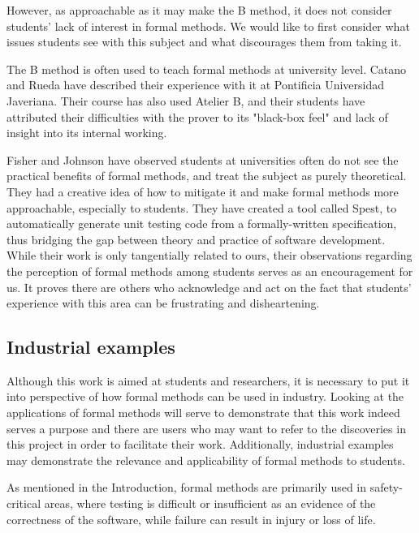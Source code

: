 \documentclass[12pt,journal,duplex]{IEEEtran}
\begin{document}
	However, as approachable as it may make the B method, it does not consider students' lack of interest in formal methods. We would like to first consider what issues students see with this subject and what discourages them from taking it.
	
	The B method is often used to teach formal methods at university level. Catano and Rueda have described their experience with it at Pontificia Universidad Javeriana. Their course has also used Atelier B, and their students have attributed their difficulties with the prover to its "black-box feel" and lack of insight into its internal working.\cite{teaching}

	Fisher and Johnson have observed students at universities often do not see the practical benefits of formal methods, and treat the subject as purely theoretical.\cite{test generation} They had a creative idea of how to mitigate it and make formal methods more approachable, especially to students. They have created a tool called Spest, to automatically generate unit testing code from a formally-written specification, thus bridging the gap between theory and practice of software development. While their work is only tangentially related to ours, their observations regarding the perception of formal methods among students serves as an encouragement for us. It proves there are others who acknowledge and act on the fact that students' experience with this area can be frustrating and disheartening.



	\subsection{Industrial examples}
	Although this work is aimed at students and researchers, it is necessary to put it into perspective of how formal methods can be used in industry. Looking at the applications of formal methods will serve to demonstrate that this work indeed serves a purpose and there are users who may want to refer to the discoveries in this project in order to facilitate their work. Additionally, industrial examples may demonstrate the relevance and applicability of formal methods to students.

	As mentioned in the Introduction, formal methods are primarily used in safety-critical areas, where testing is difficult or insufficient as an evidence of the correctness of the software, while failure can result in injury or loss of life.
\end{document}

